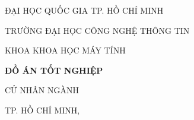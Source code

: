 \begin{titlepage}
\coverframe
\centering
{\fontsize{13}{16}\selectfont ĐẠI HỌC QUỐC GIA TP. HỒ CHÍ MINH\par}
{\fontsize{13}{16}\selectfont TRƯỜNG ĐẠI HỌC CÔNG NGHỆ THÔNG TIN\par}
\vspace{0.3cm}
{\fontsize{13}{16}\selectfont KHOA KHOA HỌC MÁY TÍNH\par}

\vfill
{\fontsize{14}{18}\selectfont \authorname\par}
\vspace{1.5cm}

{\fontsize{16}{20}\bfseries ĐỒ ÁN TỐT NGHIỆP\par}
\vspace{0.8cm}
{\fontsize{15}{20}\bfseries \thesistitle\par}
\vspace{0.4cm}
{\fontsize{13}{18}\itshape \thesistitleEN\par}

\vspace{1.5cm}
{\fontsize{14}{18}\selectfont CỬ NHÂN NGÀNH \MakeUppercase{\major}\par}

\vfill
{\fontsize{13}{16}\selectfont TP. HỒ CHÍ MINH, \thesisyear\par}
\end{titlepage}
